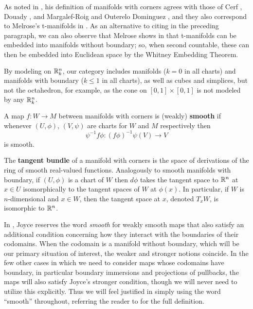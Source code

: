 As noted in \cite[Remark 2.11]{Joy12}, his definition of manifolds with corners agrees with those of Cerf \cite{Ce61}, Douady \cite{Doua61}, and Margalef-Roig and Outerelo Dominguez \cite{MaDo92}, and they also correspond to Melrose's t-manifolds in \cite{Melrose}. 
As an alternative to citing \cite{MaDo92} in the preceding paragraph, we can also observe that Melrose shows in \cite[Proposition 1.14.1]{Melrose} that t-manifolds can be embedded into manifolds without boundary; so, when second countable, these can then be embedded into Euclidean space by the Whitney Embedding Theorem.



By modeling on $\mathbb{R}^n_k$, our category includes manifolds ($k = 0$ in all charts) and manifolds with boundary ($k \leq 1$ in all charts), as well as cubes and simplices, but not the octahedron, for example, as the cone on $[0,1] \times [0,1]$ is not modeled by any $\mathbb{R}^n_k$.

\begin{comment}
	The smooth real-valued functions on a manifold with corners $W$ are those $f$ such that for each chart $\phi \colon U \subset \R^n_k \to W$ the composition $f \circ \phi \colon U \to \R$ is smooth.
\end{comment}

\begin{definition}
	A map $f \colon W \to M$ between manifolds with corners is {(weakly) \bf smooth} if whenever $(U,\phi)$, $(V,\psi)$ are charts for $W$ and $M$ respectively then
	$$\psi^{-1}f \phi \colon (f\phi)^{-1}\psi(V) \to V$$
	is smooth.

	The \textbf{tangent bundle} of a manifold with corners is the space of derivations of the ring of smooth real-valued functions.
	Analogously to smooth manifolds with boundary, if $(U,\phi)$ is a chart of $W$ then $d\phi$ takes the tangent space to $\mathbb{R}^n$ at $x \in U$ isomorphically to the tangent spaces of $W$ at $\phi(x)$.
	In particular, if $W$ is $n$-dimensional and $x \in W$, then the tangent space at $x$, denoted $T_xW$, is isomorphic to $\mathbb{R}^n$.
\end{definition}

In \cite{Joy12}, Joyce reserves the word \textit{smooth} for weakly smooth maps that also satisfy an additional condition concerning how they interact with the boundaries of their codomains.
When the codomain is a manifold without boundary, which will be our primary situation of interest, the weaker and stronger notions coincide.
In the few other cases in which we need to consider maps whose codomains have boundary, in particular boundary immersions and projections of pullbacks, the maps will also satisfy Joyce's stronger condition, though we will never need to utilize this explicitly.
Thus we will feel justified in simply using the word ``smooth'' throughout, referring the reader to \cite[Definition 3.1]{Joy12} for the full definition.

